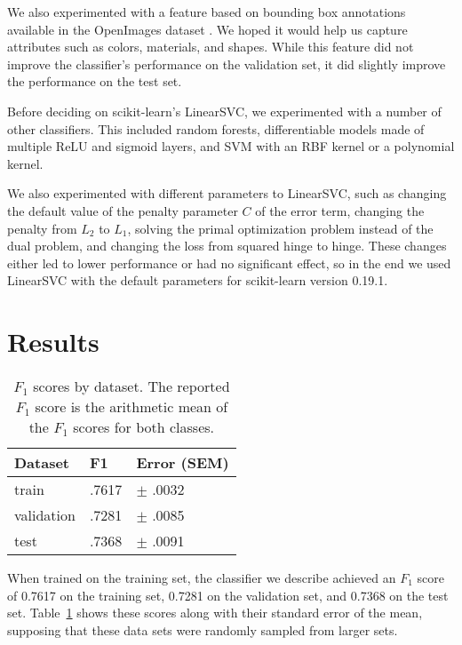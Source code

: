 \documentclass[11pt,a4paper]{article}
\begin{document}
We also experimented with a feature based on bounding box annotations available
in the OpenImages dataset \cite{openimages}. We hoped it would help us capture
attributes such as colors, materials, and shapes. While this feature did not
improve the classifier's performance on the validation set, it did slightly
improve the performance on the test set.

Before deciding on scikit-learn's LinearSVC, we experimented with a number of
other classifiers. This included random forests, differentiable models made of
multiple ReLU and sigmoid layers, and SVM with an RBF kernel or a polynomial
kernel.

We also experimented with different parameters to LinearSVC, such as changing the
default value of the penalty parameter $C$ of the error term, changing the
penalty from $L_2$ to $L_1$, solving the primal optimization problem instead of
the dual problem, and changing the loss from squared hinge to hinge. These
changes either led to lower performance or had no significant effect, so in the
end we used LinearSVC with the default parameters for scikit-learn version
0.19.1.

\section{Results}

\begin{table}[t]
\begin{small}
\begin{tabular}{lll}
\textbf{Dataset} & \textbf{F1} & \textbf{Error} (SEM)\\
\hline
train 		& .7617 & $\pm$ .0032\\
validation	& .7281 & $\pm$ .0085\\
test		& .7368 & $\pm$ .0091\\
\end{tabular}
\end{small}
\caption{$F_1$ scores by dataset. The reported $F_1$ score is the arithmetic
mean of the $F_1$ scores for both classes.}
\label{table:results-table}
\end{table}

When trained on the training set, the classifier we describe achieved an $F_1$
score of 0.7617 on the training set, 0.7281 on the validation set, and 0.7368
on the test set. Table~\ref{table:results-table} shows these scores along with
their standard error of the mean, supposing that these data sets were randomly
sampled from larger sets.
\end{document}
